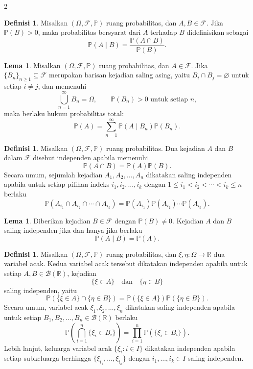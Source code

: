\documentclass[a4paper,extrafontsizes, 9pt]{memoir}
\theoremstyle{definition}
\newtheorem{definisi}[kalstok]{Definisi}
\newtheorem{lemma}[kalstok]{Lema}
\theoremstyle{plain}
\theoremstyle{remark}
\begin{document}
\begin{multicols}{2}
  \begin{definisi}
    Misalkan $(\Omega,\mathcal{F},\mathbb{P})$ ruang probabilitas, dan $A,B\in\mathcal{F}$.
    Jika $\mathbb{P}(B)>0$, maka probabilitas bersyarat dari $A$ terhadap $B$ didefinisikan sebagai
    \[\mathbb{P}(A\mid B)=\frac{\mathbb{P}(A\cap B)}{\mathbb{P}(B)}.\]
  \end{definisi}

  \begin{lemma}
    Misalkan $(\Omega,\mathcal{F},\mathbb{P})$ ruang probabilitas, dan $A\in\mathcal{F}$.
    Jika $\{B_n\}_{n\ge1}\subseteq\mathcal{F}$ merupakan barisan kejadian saling asing,
    yaitu $B_i\cap B_j=\varnothing$ untuk setiap $i\ne j$, dan memenuhi
    \[\bigcup_{n=1}^{\infty}B_n=\Omega,\qquad \mathbb{P}(B_n)>0\text{ untuk setiap }n,\]
    maka berlaku hukum probabilitas total:
    \[\mathbb{P}(A)=\sum_{n=1}^{\infty}\mathbb{P}(A\mid B_n)\mathbb{P}(B_n).\]
  \end{lemma}

  \begin{definisi}
    Misalkan $(\Omega,\mathcal{F},\mathbb{P})$ ruang probabilitas. Dua kejadian $A$ dan $B$ dalam
    $\mathcal{F}$ disebut independen apabila memenuhi
    \[\mathbb{P}(A\cap B)=\mathbb{P}(A)\mathbb{P}(B).\]
    Secara umum, sejumlah kejadian $A_1,A_2,\ldots,A_n$ dikatakan saling independen apabila
    untuk setiap pilihan indeks $i_1,i_2,\ldots,i_k$ dengan $1\le i_1<i_2<\cdots<i_k\le n$ berlaku
    \[\mathbb{P}(A_{i_1}\cap A_{i_2}\cap\cdots\cap A_{i_k})
      =\mathbb{P}(A_{i_1})\mathbb{P}(A_{i_2})\cdots\mathbb{P}(A_{i_k}).\]
  \end{definisi}

  \begin{lemma}
    Diberikan kejadian $B\in\mathcal{F}$ dengan $\mathbb{P}(B)\neq0$.
    Kejadian $A$ dan $B$ saling independen jika dan hanya jika berlaku
    \[\mathbb{P}(A\mid B)=\mathbb{P}(A).\]
  \end{lemma}

  \begin{definisi}
    Misalkan $(\Omega,\mathcal{F},\mathbb{P})$ ruang probabilitas, dan
    $\xi,\eta:\Omega\to\mathbb{R}$ dua variabel acak.
    Kedua variabel acak tersebut dikatakan independen apabila untuk setiap
    $A,B\in\mathcal{B}(\mathbb{R})$, kejadian
    \[\{\xi\in A\}\quad\text{dan}\quad\{\eta\in B\}\]
    saling independen, yaitu
    \[\mathbb{P}(\{\xi\in A\}\cap\{\eta\in B\})=\mathbb{P}(\{\xi\in A\})\mathbb{P}(\{\eta\in B\}).\]
    Secara umum, variabel acak $\xi_1,\xi_2,\ldots,\xi_n$ dikatakan saling independen apabila
    untuk setiap $B_1,B_2,\ldots,B_n\in\mathcal{B}(\mathbb{R})$ berlaku
    \[\mathbb{P}\!\left(\bigcap_{i=1}^{n}\{\xi_i\in B_i\}\right)=\prod_{i=1}^{n}\mathbb{P}(\{\xi_i\in B_i\}).\]
    Lebih lanjut, keluarga variabel acak $\{\xi_i:i\in I\}$ dikatakan independen apabila
    setiap subkeluarga berhingga $\{\xi_{i_1},\ldots,\xi_{i_k}\}$ dengan
    $i_1,\ldots,i_k\in I$ saling independen.
  \end{definisi}


\end{multicols}
\end{document}
